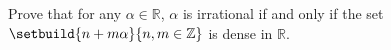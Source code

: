 Prove that for any $\alpha \in \mathbb{R}$,
$\alpha$ is irrational if and only if
the set $\setbuild{n + m \alpha}{n, m \in \mathbb{Z}}$
is dense in $\mathbb{R}$.
